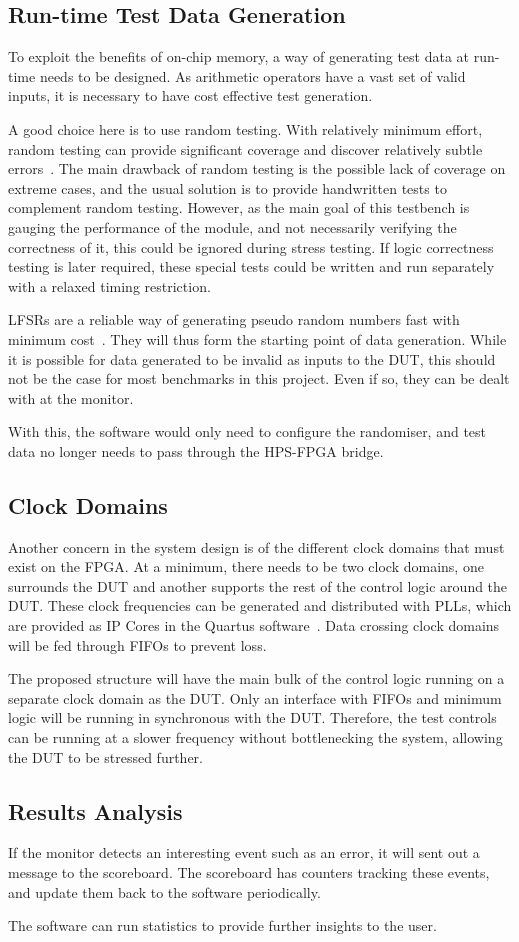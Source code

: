\subsection{Run-time Test Data Generation}
To exploit the benefits of on-chip memory, a way of generating test data
at run-time needs to be designed.
As arithmetic operators have a vast set of valid inputs, it is necessary to
have cost effective test generation.

A good choice here is to use random testing.
With relatively minimum effort, random testing can provide significant coverage
and discover relatively subtle errors~\cite{Duran1}.
The main drawback of random testing is the possible lack of coverage on extreme
cases, and the usual solution is to provide handwritten tests to complement
random testing.
However, as the main goal of this testbench is gauging the performance of
the module, and not necessarily verifying the correctness of it,
this could be ignored during stress testing.
If logic correctness testing is later required, these special tests could be
written and run separately with a relaxed timing restriction.

LFSRs are a reliable way of generating pseudo random numbers fast with minimum
cost~\cite{Hazwani1}.
They will thus form the starting point of data generation.
While it is possible for data generated to be invalid as inputs to the DUT, this
should not be the case for most benchmarks in this project.
Even if so, they can be dealt with at the monitor.

With this, the software would only need to configure the randomiser, and test
data no longer needs to pass through the HPS-FPGA bridge.

\subsection{Clock Domains}
Another concern in the system design is of the different clock domains that
must exist on the FPGA.
At a minimum, there needs to be two clock domains, one surrounds the DUT and
another supports the rest of the control logic around the DUT.
These clock frequencies can be generated and distributed with PLLs, which are
provided as IP Cores in the Quartus software~\cite{Altera4}.
Data crossing clock domains will be fed through FIFOs to prevent loss.

The proposed structure will have the main bulk of the control logic running
on a separate clock domain as the DUT.
Only an interface with FIFOs and minimum logic will be running in synchronous
with the DUT.
Therefore, the test controls can be running at a slower frequency without
bottlenecking the system, allowing the DUT to be stressed further.

\subsection{Results Analysis}
If the monitor detects an interesting event such as an error, it will sent out
a message to the scoreboard.
The scoreboard has counters tracking these events, and update them back to the
software periodically.

The software can run statistics to provide further insights to the user.